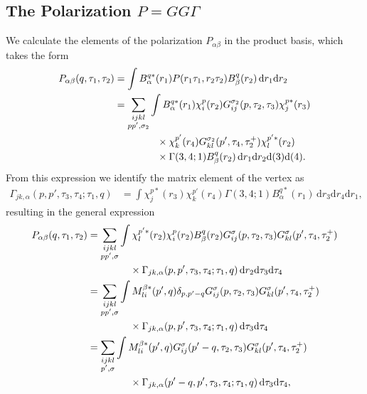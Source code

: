 \documentclass[12pt,a4paper]{scrartcl}
\numberwithin{equation}{section}
\begin{document}
\subsection{The Polarization $P=GG\Gamma$}
We calculate the elements of the polarization $P_{\alpha\beta}$
in the product basis, which takes the form
\begin{align}
 P_{\alpha\beta}(q,\tau_1,\tau_2)
 &= \int B^{q*}_{\alpha}(r_1) P(r_1\tau_1,r_2\tau_2) B^{q}_{\beta}(r_2) 
 \, \mathrm{d}r_1 \mathrm{d}r_2 \\
%
&= \sum_{\substack{ ijkl\\ pp',\sigma_2 }} \int B^{q*}_{\alpha}(r_1) 
                        \chi^p_{i}(r_2) G^{\sigma_2}_{ij}(p,\tau_2,\tau_3) \chi^{p*}_{j}(r_3) \nonumber \\
& \hspace{1.5cm}\times  \chi^{p'}_{k}(r_4) G^{\sigma_2}_{kl}(p',\tau_4,\tau_2^+) \chi^{p'*}_{l}(r_2) \nonumber \\
& \hspace{1.5cm}	\times  \Gamma(3,4;1)  B^{q}_{\beta}(r_2) 
       \,  \mathrm{d}r_1 \mathrm{d}r_2\mathrm{d}(3)\mathrm{d}(4) .
\end{align}
From this expression we identify the matrix element of the 
vertex as
\begin{align}
\Gamma_{jk,\alpha}(p,p',\tau_3,\tau_4;\tau_1,q)
&= \int \chi^{p*}_{j}(r_3) \chi^{p'}_{k}(r_4) \Gamma(3,4;1) B^{q*}_{\alpha}(r_1)
    \,\mathrm{d}r_3\mathrm{d}r_4 \mathrm{d}r_1,
\end{align}
resulting in the general expression
\begin{align}
 P_{\alpha\beta}(q,\tau_1,\tau_2)
%
&= \sum_{\substack{ijkl\\pp',\sigma}} \int 
     \chi^{p'*}_{l}(r_2) \chi^p_{i}(r_2) B^{q}_{\beta}(r_2)
      G^{\sigma}_{ij}(p,\tau_2,\tau_3) G^{\sigma}_{kl}(p',\tau_4,\tau_2^+)  \nonumber \\
& \hspace{1.5cm} \times  \Gamma_{jk,\alpha}(p,p',\tau_3,\tau_4;\tau_1,q)
          \,  \mathrm{d}r_2\mathrm{d}\tau_3 \mathrm{d}\tau_4 \\
%
&= \sum_{ \substack{ijkl\\pp',\sigma}} \int 
     M^{\beta*}_{li}(p',q) \delta_{p,p'-q}
      G^{\sigma}_{ij}(p,\tau_2,\tau_3) G^{\sigma}_{kl}(p',\tau_4,\tau_2^+)  \nonumber \\
& \hspace{1.5cm} \times  \Gamma_{jk,\alpha}(p,p',\tau_3,\tau_4;\tau_1,q)
          \,  \mathrm{d}\tau_3 \mathrm{d}\tau_4 \\
%
&= \sum_{ \substack{ijkl\\p',\sigma}} \int 
     M^{\beta*}_{li}(p',q) 
      G^{\sigma}_{ij}(p'-q,\tau_2,\tau_3) G^{\sigma}_{kl}(p',\tau_4,\tau_2^+)  \nonumber \\
& \hspace{1.5cm} \times  \Gamma_{jk,\alpha}(p'-q,p',\tau_3,\tau_4;\tau_1,q)
          \,  \mathrm{d}\tau_3 \mathrm{d}\tau_4 ,
\end{align}
\end{document}
